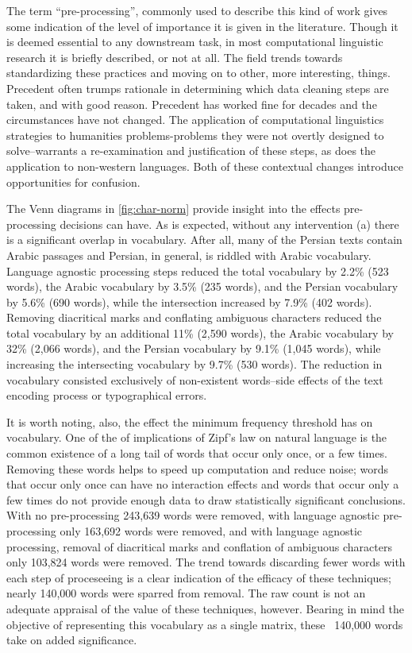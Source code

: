 \documentclass[12pt, oneside]{report}
\begin{document}
\par
The term ``pre-processing'', commonly used to describe this kind of work gives some indication of the level of importance it is given in the literature. Though it is deemed essential to any downstream task, in most computational linguistic research it is briefly described, or not at all. The field trends towards standardizing these practices and moving on to other, more interesting, things. Precedent often trumps rationale in determining which data cleaning steps are taken, and with good reason. Precedent has worked fine for decades and the circumstances have not changed. The application of computational linguistics strategies to humanities problems-problems they were not overtly designed to solve–warrants a re-examination and justification of these steps, as does the application to non-western languages. Both of these contextual changes introduce opportunities for confusion.
\par
The Venn diagrams in \autoref{fig:char-norm} provide insight into the effects pre-processing decisions can have. As is expected, without any intervention (a) there is a significant overlap in vocabulary. After all, many of the Persian texts contain Arabic passages and Persian, in general, is riddled with Arabic vocabulary. Language agnostic processing steps reduced the total vocabulary by 2.2\% (523 words), the Arabic vocabulary by 3.5\% (235 words), and the Persian vocabulary by 5.6\% (690 words), while the intersection increased by 7.9\% (402 words). Removing diacritical marks and conflating ambiguous characters reduced the total vocabulary by an additional 11\% (2,590 words), the Arabic vocabulary by 32\% (2,066 words), and the Persian vocabulary by 9.1\% (1,045 words), while increasing the intersecting vocabulary by 9.7\% (530 words). The reduction in vocabulary consisted exclusively of non-existent words–side effects of the text encoding process or typographical errors.
\par
It is worth noting, also, the effect the minimum frequency threshold has on vocabulary. One of the of implications of Zipf's law on natural language is the common existence of a long tail of words that occur only once, or a few times. Removing these words helps to speed up computation and reduce noise; words that occur only once can have no interaction effects and words that occur only a few times do not provide enough data to draw statistically significant conclusions. With no pre-processing 243,639 words were removed, with language agnostic pre-processing only 163,692 words were removed, and with language agnostic processing, removal of diacritical marks and conflation of ambiguous characters only 103,824 words were removed. The trend towards discarding fewer words with each step of proceseeing is a clear indication of the efficacy of these techniques; nearly 140,000 words were sparred from removal. The raw count is not an adequate appraisal of the value of these techniques, however. Bearing in mind the objective of representing this vocabulary as a single matrix, these ~140,000 words take on added significance.
\end{document}
